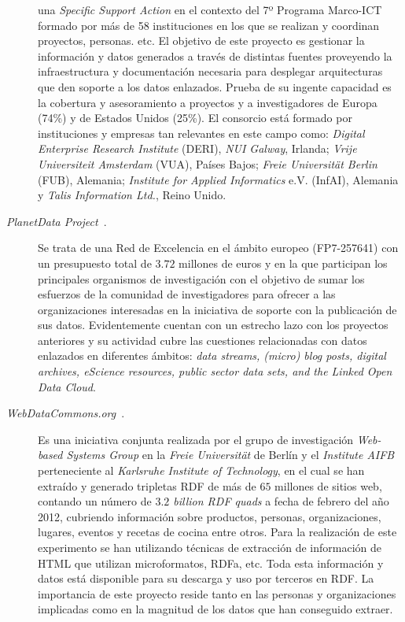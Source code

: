 \begin{description}
una \textit{Specific Support Action} en el contexto del 7º Programa Marco-ICT formado por más de 58 instituciones
en los que se realizan y coordinan proyectos, personas. etc. El objetivo de este proyecto es gestionar la información
y datos generados a través de distintas fuentes proveyendo la infraestructura y documentación necesaria para
desplegar arquitecturas que den soporte a los datos enlazados. Prueba de su ingente capacidad es la cobertura y 
asesoramiento a proyectos y a investigadores de Europa (74\%) y de Estados Unidos (25\%). El consorcio
está formado por instituciones y empresas tan relevantes en este campo como: \textit{Digital Enterprise Research Institute} (DERI), \textit{NUI Galway}, Irlanda;
\textit{Vrije Universiteit Amsterdam} (VUA), Países Bajos; \textit{Freie Universit\"{a}t Berlin} (FUB), Alemania; \textit{Institute for Applied Informatics} e.V. (InfAI), Alemania y
\textit{Talis Information Ltd.}, Reino Unido.

\item [\textit{PlanetData Project}~\cite{planet-data-project}.] Se trata de una Red de Excelencia en el 
ámbito europeo (FP7-257641) con un presupuesto total de $3.72$ millones de euros y en la que participan los principales 
organismos de investigación con el objetivo de sumar los esfuerzos de la comunidad de investigadores para ofrecer 
a las organizaciones interesadas en la iniciativa de \linkeddata soporte con la publicación de sus datos. Evidentemente 
cuentan con un estrecho lazo con los proyectos anteriores y su actividad cubre las cuestiones relacionadas con datos enlazados 
en diferentes ámbitos: \textit{data streams, (micro) blog posts, digital archives, eScience resources, public sector data sets, and the Linked Open Data Cloud}.

\item [\textit{WebDataCommons.org}~\cite{web-data-commons-project}.] Es una iniciativa conjunta realizada por el grupo 
de investigación \textit{Web-based Systems Group} en la \textit{Freie Universit\"{a}t} de Berlín y el 
\textit{Institute AIFB} perteneciente al \textit{Karlsruhe Institute of Technology}, en el cual se han extraído 
y generado tripletas \gls{RDF} de más de $65$ millones de sitios web, contando un número de 
\textit{$3.2$ billion RDF quads} a fecha de febrero del año 2012, cubriendo información sobre productos, 
personas, organizaciones, lugares, eventos y recetas de cocina entre otros. Para la realización de este 
experimento se han utilizando técnicas de extracción de información de \gls{HTML} que utilizan microformatos, RDFa, etc. 
Toda esta información y datos está disponible para su descarga y uso por terceros en RDF. La importancia de este proyecto 
reside tanto en las personas y organizaciones implicadas como en la magnitud de los datos que han conseguido extraer.


\end{description}
